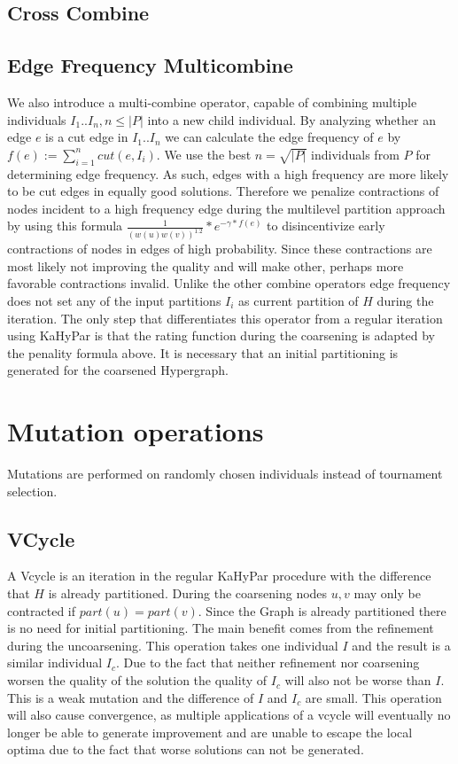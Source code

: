 \documentclass[a4paper,12pt,bibtotoc,titlepage, liststotoc,BCOR7mm,headsepline,pointlessnumbers]{scrbook}
\numberwithin{equation}{section}
\begin{document}
\subsection{Cross Combine}

\subsection{Edge Frequency Multicombine}
We also introduce a multi-combine operator, capable of combining multiple individuals $I_1.. I_n, n \le |P|$ into a new child individual. By analyzing whether an edge $e$ is a cut edge in $I_1 ..I_n$ we can calculate the edge frequency of $e$ by $f(e) := \sum_{i=1}^n cut(e,I_i)$. We use the best $n = \sqrt{|P|}$ individuals from $P$ for determining edge frequency. As such, edges with a high frequency are more likely to be cut edges in equally good solutions. Therefore we penalize contractions of nodes incident to a high frequency edge during the multilevel partition approach by using this formula $\frac{1}{(w(u)w(v))^{1.2}}*e^{-\gamma*f(e)}$ to disincentivize early contractions of nodes in edges of high probability. Since these contractions are most likely not improving the quality and will make other, perhaps more favorable contractions invalid. Unlike the other combine operators edge frequency does not set any of the input partitions $I_i$ as current partition of $H$ during the iteration. The only step that differentiates this operator from a regular iteration using KaHyPar is that the rating function during the coarsening is adapted by the penality formula above. It is necessary that an initial partitioning is generated for the coarsened Hypergraph.
\section{Mutation operations}
Mutations are performed on randomly chosen individuals instead of tournament selection.
\subsection{VCycle}
A Vcycle is an iteration in the regular KaHyPar procedure with the difference that $H$ is already partitioned. During the coarsening nodes $u,v$ may only be contracted if $part(u) = part(v)$. Since the Graph is already partitioned there is no need for initial partitioning. The main benefit comes from the refinement during the uncoarsening. This operation takes one individual $I$ and the result is a similar individual $I_c$. Due to the fact that neither refinement nor coarsening worsen the quality of the solution the quality of $I_c$ will also not be worse than $I$. This is a weak mutation and the difference of $I$ and $I_c$ are small. This operation will also cause convergence, as multiple applications of a vcycle will eventually no longer be able to generate improvement and are unable to escape the local optima due to the fact that worse solutions can not be generated.   
\end{document}

